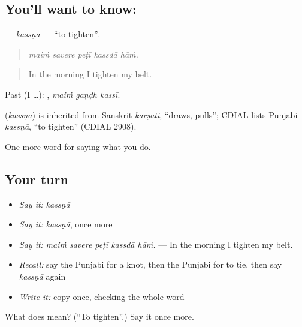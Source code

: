 \subsection*{You'll want to know: }
\textbf{} — \emph{kassṇā} — \textquotedblleft{}to tighten\textquotedblright{}.

\begin{quote}
    
\end{quote}

\begin{quote}
\emph{maiṁ savere peṭī kassdā hāṁ.}
\end{quote}

\begin{quote}
In the morning I tighten my belt.
\end{quote}

Past (I …):   , \emph{maiṁ gaṇḍh kassī}.

\begin{cousinweb}
\textbf{} (\emph{kassṇā}) is inherited from Sanskrit \emph{karṣati}, \textquotedblleft{}draws, pulls\textquotedblright{}; CDIAL lists Punjabi \emph{kassṇā}, \textquotedblleft{}to tighten\textquotedblright{} (CDIAL 2908).
\end{cousinweb}

\begin{grammarlens}[title={What you've built}]
One more word for saying what you do.
\end{grammarlens}

\subsection*{Your turn}
\begin{itemize}
\raggedright
  \item \emph{Say it:} \emph{kassṇā}
  \item \emph{Say it:} \emph{kassṇā}, once more
  \item \emph{Say it:} \emph{maiṁ savere peṭī kassdā hāṁ.} — In the morning I tighten my belt.
  \item \emph{Recall:} say the Punjabi for a knot, then the Punjabi for to tie, then say \emph{kassṇā} again
  \item \emph{Write it:} copy \textbf{} once, checking the whole word
\end{itemize}

\begin{tcolorbox}[breakable,colback=teal!4,colframe=teal!35!black,title={Before you move on}]
What does  mean? (\textquotedblleft{}To tighten\textquotedblright{}.) Say it once more.
\end{tcolorbox}
